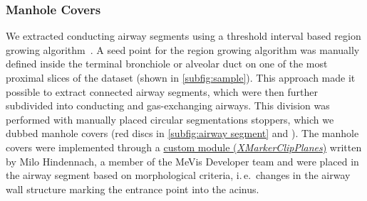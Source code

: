 \documentclass[%
	paper=a4,%
	abstract=true,%
	]{scrartcl}
\newcommand{\ie}{i.\,e.\ }
\begin{document}
\subsubsection{Manhole Covers}
We extracted conducting airway segments using a threshold interval based region growing algorithm~\cite{Zucker1976}. A seed point for the region growing algorithm was manually defined inside the terminal bronchiole or alveolar duct on one of the most proximal slices of the dataset (shown in \autoref{subfig:sample}). This approach made it possible to extract connected airway segments, which were then further subdivided into conducting and gas-exchanging airways. This division was performed with manually placed circular segmentations stoppers, which we dubbed manhole covers (red discs in \autoref{subfig:airway segment} and ). The manhole covers were implemented through a \href{http://www.mevis-research.de/cgi-bin/discus/board-auth.cgi?lm=1282233250&file=/839/11760.html}{custom module (\emph{XMarkerClipPlanes})} written by Milo Hindennach, a member of the MeVis Developer team and were placed in the airway segment based on morphological criteria, \ie changes in the airway wall structure marking the entrance point into the acinus.
\end{document}
